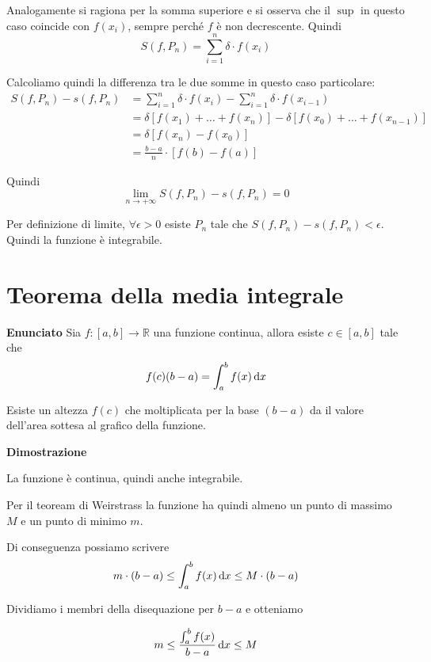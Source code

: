 Analogamente si ragiona per la somma superiore e si osserva che il $\sup$ in questo caso coincide con $f(x_i)$, sempre perché $f$ è non decrescente. Quindi
\begin{equation*}
S(f,P_n) = \sum_{i=1}^n \delta \cdot f(x_i)
\end{equation*}

Calcoliamo quindi la differenza tra le due somme in questo caso particolare:
\begin{align*}
S(f,P_n) - s(f,P_n) &= \sum_{i=1}^n \delta \cdot f(x_i) - \sum_{i=1}^n \delta \cdot f(x_{i-1}) \\
&= \delta [f(x_1) + \ldots + f(x_n)] - \delta[f(x_0) + \ldots + f(x_{n-1})] \\
&= \delta [f(x_n) - f(x_0)] \\
&= \frac{b-a}{n} \cdot [f(b)-f(a)]
\end{align*}

Quindi
\begin{equation*}
\lim_{n \to +\infty} S(f,P_n) - s(f,P_n) = 0
\end{equation*}

Per definizione di limite, $\forall \epsilon > 0$ esiste $P_n$ tale che $S(f,P_n) - s(f,P_n) < \epsilon$. Quindi la funzione è integrabile.

\section{Teorema della media integrale}

\textbf{Enunciato}
Sia $f: [a,b] \to \mathbb{R}$ una funzione continua, allora esiste $c \in [a,b]$ tale che $$f(c)(b-a) = \int_a^b f(x)\mathop{}\!\mathrm{d} x$$

\begin{tip}
Esiste un altezza $f(c)$ che moltiplicata per la base $(b-a)$ da il valore dell'area sottesa al grafico della funzione.
\end{tip}

\textbf{Dimostrazione}

La funzione è continua, quindi anche integrabile.

Per il teoream di Weirstrass la funzione ha quindi almeno un punto di massimo $M$ e un punto di minimo $m$.

Di conseguenza possiamo scrivere $$m\cdot (b-a) \leq \int_a^b f(x) \mathop{}\!\mathrm{d} x \leq M\cdot (b-a)$$

Dividiamo i membri della disequazione per $b-a$ e otteniamo

$$m \leq \frac{\int_a^b f(x)}{b-a} \mathop{}\!\mathrm{d} x \leq M$$

